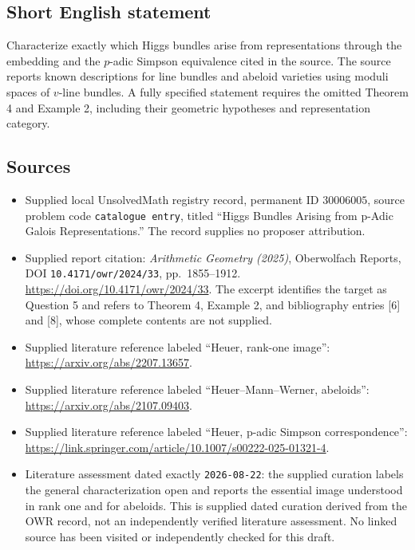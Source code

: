 \documentclass[11pt]{article}
\begin{document}
\subsection{Short English statement}
Characterize exactly which Higgs bundles arise from representations through the embedding and the \(p\)-adic Simpson equivalence cited in the source. The source reports known descriptions for line bundles and abeloid varieties using moduli spaces of \(v\)-line bundles. A fully specified statement requires the omitted Theorem 4 and Example 2, including their geometric hypotheses and representation category.
\subsection{Sources}
\begin{itemize}
\item Supplied local UnsolvedMath registry record, permanent ID \(30006005\), source problem code \texttt{catalogue entry}, titled ``Higgs Bundles Arising from p-Adic Galois Representations.'' The record supplies no proposer attribution.
\item Supplied report citation: \emph{Arithmetic Geometry (2025)}, Oberwolfach Reports, DOI \texttt{10.4171/owr/2024/33}, pp.\ 1855--1912. \url{https://doi.org/10.4171/owr/2024/33}. The excerpt identifies the target as Question 5 and refers to Theorem 4, Example 2, and bibliography entries [6] and [8], whose complete contents are not supplied.
\item Supplied literature reference labeled ``Heuer, rank-one image'': \url{https://arxiv.org/abs/2207.13657}.
\item Supplied literature reference labeled ``Heuer--Mann--Werner, abeloids'': \url{https://arxiv.org/abs/2107.09403}.
\item Supplied literature reference labeled ``Heuer, p-adic Simpson correspondence'': \url{https://link.springer.com/article/10.1007/s00222-025-01321-4}.
\item Literature assessment dated exactly \texttt{2026-08-22}: the supplied curation labels the general characterization open and reports the essential image understood in rank one and for abeloids. This is supplied dated curation derived from the OWR record, not an independently verified literature assessment. No linked source has been visited or independently checked for this draft.
\end{itemize}
\end{document}
